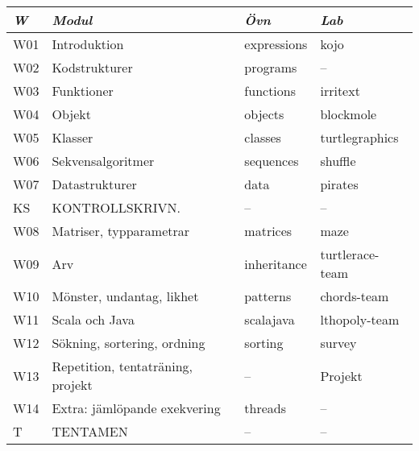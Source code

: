 \begin{tabular}{l|l|l|l}
\textit{W} & \textit{Modul} & \textit{Övn} & \textit{Lab} \\ \hline \hline
W01 & Introduktion & expressions & kojo \\
W02 & Kodstrukturer & programs & -- \\
W03 & Funktioner & functions & irritext \\
W04 & Objekt & objects & blockmole \\
W05 & Klasser & classes & turtlegraphics \\
W06 & Sekvensalgoritmer & sequences & shuffle \\
W07 & Datastrukturer & data & pirates \\
KS & KONTROLLSKRIVN. & -- & -- \\
W08 & Matriser, typparametrar & matrices & maze \\
W09 & Arv & inheritance & turtlerace-team \\
W10 & Mönster, undantag, likhet & patterns & chords-team \\
W11 & Scala och Java & scalajava & lthopoly-team \\
W12 & Sökning, sortering, ordning & sorting & survey \\
W13 & Repetition, tentaträning, projekt & -- & Projekt \\
W14 & Extra: jämlöpande exekvering & threads & -- \\
T & TENTAMEN & -- & -- \\
\end{tabular}
